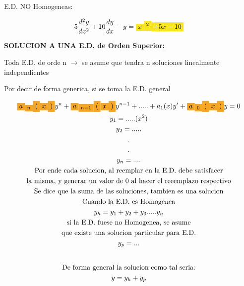 \documentclass{article}
\begin{document}
E.D. NO Homogeneas:


\begin{gather*}
5\frac{d^{2}y}{dx^{2}}+10\frac{dy}{dx}-y = \text{\colorbox[RGB]{248,231,28}{$x$}}\text{\colorbox[RGB]{248,231,28}{$^{2}$}}\text{\colorbox[RGB]{248,231,28}{$+5x-10$}}
\end{gather*}




\textbf{SOLUCION A UNA E.D. de Orden Superior:}

Toda E.D. de orde n $\rightarrow$  se asume que tendra \colorbox[RGB]{248,231,28}{n soluciones linealmente independientes}

Por decir de forma generica, si se toma la E.D. general


\begin{gather*}
\text{\colorbox[RGB]{245,166,35}{$a$}}\text{\colorbox[RGB]{245,166,35}{$_{n}$}}\text{\colorbox[RGB]{245,166,35}{$($}}\text{\colorbox[RGB]{245,166,35}{$x$}}\text{\colorbox[RGB]{245,166,35}{$)$}}y^{n}+\text{\colorbox[RGB]{245,166,35}{$a$}}\text{\colorbox[RGB]{245,166,35}{$_{n-1}$}}\text{\colorbox[RGB]{245,166,35}{$($}}\text{\colorbox[RGB]{245,166,35}{$x$}}\text{\colorbox[RGB]{245,166,35}{$)$}}y^{n-1}+.....+a_{1}(x)y'+\text{\colorbox[RGB]{245,166,35}{$a$}}\text{\colorbox[RGB]{245,166,35}{$_{0}$}}\text{\colorbox[RGB]{245,166,35}{$($}}\text{\colorbox[RGB]{245,166,35}{$x$}}\text{\colorbox[RGB]{245,166,35}{$)$}}y=0 \\
y_{1} = ..... (x^{2}) \\
y_{2}=..... \\
. \\
. \\
y_{n}= .... \\
\text{Por ende cada solucion, al reemplar en la E.D. debe satisfacer} \\
\text{la misma, y generar un valor de 0 al hacer el reeemplazo respectivo} \\
\text{Se dice que la suma de las soluciones, tambien es una solucion} \\
\text{Cuando la E.D. es Homogenea} \\
y_{h}=y_{1}+y_{2}+y_{3}.....y_{n} \\
\text{si la E.D. fuese no Homogenea, se asume} \\
\text{que existe una solucion particular para E.D.} \\
y_{p} = ... \\
\vspace{0.5em} \\
\text{De forma general la solucion como tal seria:} \\
y = y_{h}+y_{p}
\end{gather*}
\end{document}
